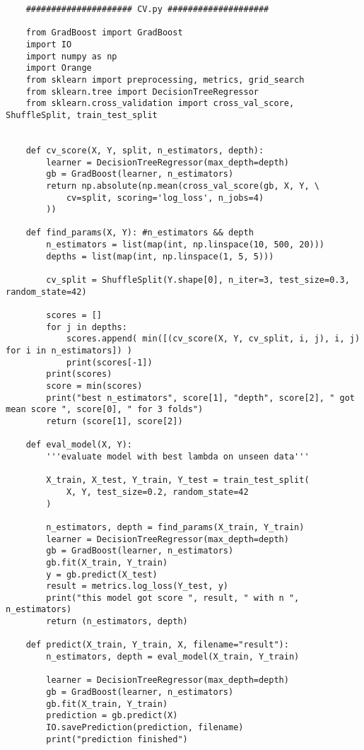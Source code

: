\documentclass[a4paper,11pt]{article}
\begin{document}
\begin{lstlisting}
    ##################### CV.py ####################

    from GradBoost import GradBoost
    import IO
    import numpy as np
    import Orange
    from sklearn import preprocessing, metrics, grid_search
    from sklearn.tree import DecisionTreeRegressor
    from sklearn.cross_validation import cross_val_score, ShuffleSplit, train_test_split


    def cv_score(X, Y, split, n_estimators, depth):
        learner = DecisionTreeRegressor(max_depth=depth)
        gb = GradBoost(learner, n_estimators)
        return np.absolute(np.mean(cross_val_score(gb, X, Y, \
            cv=split, scoring='log_loss', n_jobs=4)
        ))

    def find_params(X, Y): #n_estimators && depth
        n_estimators = list(map(int, np.linspace(10, 500, 20)))
        depths = list(map(int, np.linspace(1, 5, 5)))

        cv_split = ShuffleSplit(Y.shape[0], n_iter=3, test_size=0.3, random_state=42)

        scores = []
        for j in depths:
            scores.append( min([(cv_score(X, Y, cv_split, i, j), i, j) for i in n_estimators]) )
            print(scores[-1])
        print(scores)
        score = min(scores)
        print("best n_estimators", score[1], "depth", score[2], " got mean score ", score[0], " for 3 folds")
        return (score[1], score[2])

    def eval_model(X, Y):
        '''evaluate model with best lambda on unseen data'''

        X_train, X_test, Y_train, Y_test = train_test_split(
            X, Y, test_size=0.2, random_state=42
        )

        n_estimators, depth = find_params(X_train, Y_train)
        learner = DecisionTreeRegressor(max_depth=depth)
        gb = GradBoost(learner, n_estimators)
        gb.fit(X_train, Y_train)
        y = gb.predict(X_test)
        result = metrics.log_loss(Y_test, y)
        print("this model got score ", result, " with n ", n_estimators)
        return (n_estimators, depth)

    def predict(X_train, Y_train, X, filename="result"):
        n_estimators, depth = eval_model(X_train, Y_train)

        learner = DecisionTreeRegressor(max_depth=depth)
        gb = GradBoost(learner, n_estimators)
        gb.fit(X_train, Y_train)
        prediction = gb.predict(X)
        IO.savePrediction(prediction, filename)
        print("prediction finished")


\end{lstlisting}
\end{document}
